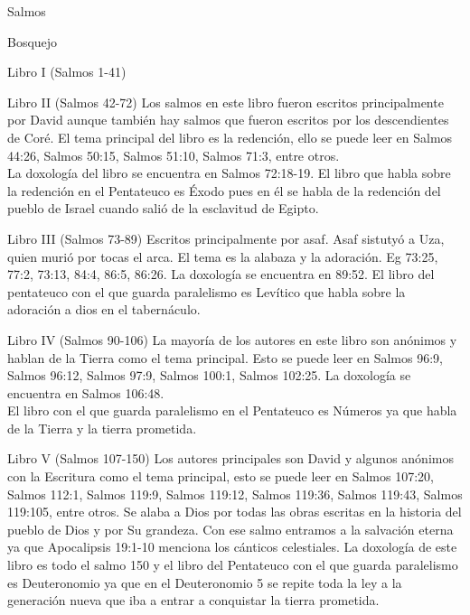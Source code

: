\begin{section}{Salmos}
\begin{subsection}{Bosquejo}
\begin{subsubsection}{Libro I (Salmos 1-41)}
		\end{subsubsection}
		\begin{subsubsection}{Libro II (Salmos 42-72)}
			Los salmos en este libro fueron escritos principalmente por David aunque también hay salmos que fueron escritos por los descendientes de Coré. El tema principal del libro es la redención, ello se puede leer en Salmos 44:26, Salmos 50:15, Salmos 51:10, Salmos 71:3, entre otros.\\
			La doxología del libro se encuentra en Salmos 72:18-19. El libro que habla sobre la redención en el Pentateuco es Éxodo pues en él se habla de la redención del pueblo de Israel cuando salió de la esclavitud de Egipto.
		\end{subsubsection}
		\begin{subsubsection}{Libro III (Salmos 73-89)}
			Escritos principalmente por asaf. Asaf sistutyó a Uza, quien murió por tocas el arca. El tema es la alabaza y la adoración. Eg 73:25, 77:2, 73:13, 84:4, 86:5, 86:26. La doxología se encuentra en 89:52. El libro del pentateuco con el que guarda paralelismo es Levítico que habla sobre la adoración a dios en el tabernáculo.
		\end{subsubsection}
		\begin{subsubsection}{Libro IV (Salmos 90-106)}
			La mayoría de los autores en este libro son anónimos y hablan de la Tierra como el tema principal. Esto se puede leer en Salmos 96:9, Salmos 96:12, Salmos 97:9, Salmos 100:1, Salmos 102:25. La doxología se encuentra en Salmos 106:48.\\
			El libro con el que guarda paralelismo en el Pentateuco es Números ya que habla de la Tierra y la tierra prometida.
		\end{subsubsection}
		\begin{subsubsection}{Libro V (Salmos 107-150)}
			Los autores principales son David y algunos anónimos con la Escritura como el tema principal, esto se puede leer en  Salmos 107:20, Salmos 112:1, Salmos 119:9, Salmos 119:12, Salmos 119:36, Salmos 119:43, Salmos 119:105, entre otros. Se alaba a Dios por todas las obras escritas en la historia del pueblo de Dios y por Su grandeza. Con ese salmo entramos a la salvación eterna ya que  Apocalipsis 19:1-10 menciona los cánticos celestiales. La doxología de este libro es todo el salmo 150 y el libro del Pentateuco con el que guarda paralelismo es Deuteronomio ya que en el Deuteronomio 5 se repite toda la ley a la generación nueva que iba a entrar a conquistar la tierra prometida.
		\end{subsubsection}

\end{subsection}
\end{section}
